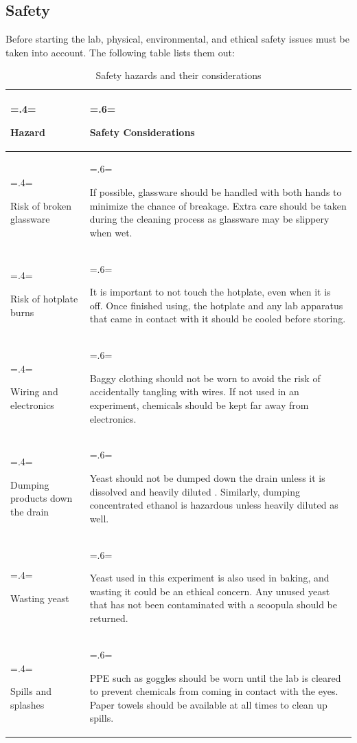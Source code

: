 \documentclass{article}
\begin{document}
\subsection{Safety}
Before starting the lab, physical, environmental, and ethical safety issues must be taken into account. The following table lists them out:
\begin{table}[H]
\centering
\caption{Safety hazards and their considerations}
\label{table:1}
\begin{tabularx}{\textwidth} {
    | >{\hsize=.4\hsize \linewidth=\hsize \raggedright\arraybackslash}X
    | >{\hsize=.6\hsize \linewidth=\hsize \raggedright\arraybackslash}X |
}
    \hline
    \textbf{Hazard} & \textbf{Safety Considerations} \\
    \hline
    Risk of broken glassware & If possible, glassware should be handled with both hands to minimize the chance of breakage. Extra care should be taken during the cleaning process as glassware may be slippery when wet.\\
    \hline
    Risk of hotplate burns & It is important to not touch the hotplate, even when it is off. Once finished using, the hotplate and any lab apparatus that came in contact with it should be cooled before storing.\\
    \hline
    Wiring and electronics & Baggy clothing should not be worn to avoid the risk of accidentally tangling with wires. If not used in an experiment, chemicals should be kept far away from electronics.\\
    \hline
    Dumping products down the drain & Yeast should not be dumped down the drain unless it is dissolved and heavily diluted \parencite{ref}. Similarly, dumping concentrated ethanol is hazardous unless heavily diluted as well. \parencite{ref}\\
    \hline
    Wasting yeast & Yeast used in this experiment is also used in baking, and wasting it could be an ethical concern. Any unused yeast that has not been contaminated with a scoopula should be returned.\\
    \hline
    Spills and splashes & PPE such as goggles should be worn until the lab is cleared to prevent chemicals from coming in contact with the eyes. Paper towels should be available at all times to clean up spills.\\
    \hline
\end{tabularx}
\end{table}
\end{document}
